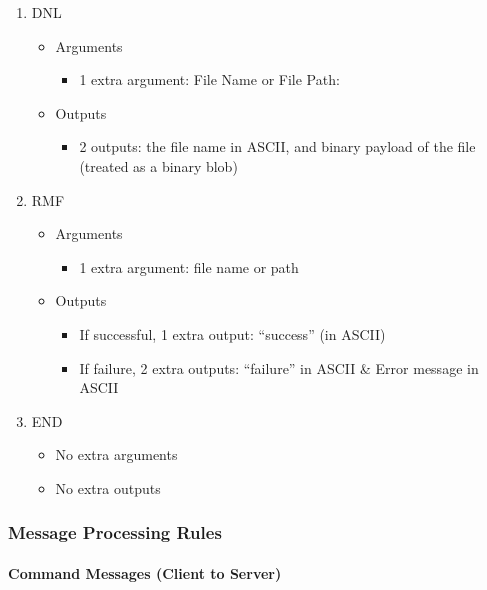 \documentclass[12pt]{article}
\begin{document}
\begin{enumerate}
\begin{itemize}
    \end{itemize}
    \item DNL
    \begin{itemize}
        \item Arguments
        \begin{itemize}
            \item 1 extra argument: File Name or File Path:
        \end{itemize}
        \item Outputs
        \begin{itemize}
           \item 2 outputs: the file name in ASCII, and binary payload of the file (treated as a binary blob)
        \end{itemize}
    \end{itemize}
    \item RMF
    \begin{itemize}
        \item Arguments
        \begin{itemize}
            \item 1 extra argument: file name or path
        \end{itemize}
        \item Outputs
        \begin{itemize}
           \item If successful, 1 extra output: “success” (in ASCII)
           \item If failure, 2 extra outputs: “failure” in ASCII \& Error message in ASCII
        \end{itemize}
    \end{itemize}
    \item END
    \begin{itemize}
        \item No extra arguments
        \item No extra outputs
    \end{itemize}
\end{enumerate}


\subsubsection{Message Processing Rules}

\paragraph{Command Messages (Client to Server)}
\end{document}
